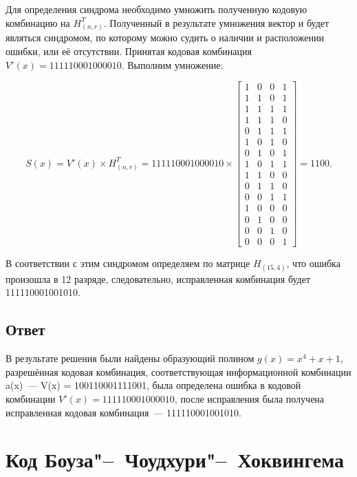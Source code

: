 Для определения синдрома необходимо умножить полученную кодовую
комбинацию на $H^T_{(n, r)}$. Полученный в результате умножения вектор
и будет являться синдромом, по которому можно судить о наличии и
расположении ошибки, или её отсутствии. Принятая кодовая комбинация
$V'(x) = 111110001000010$. Выполним умножение:

\begin{equation*}
  S(x) = V'(x) \times H^T_{(n, r)} = 111110001000010 \times
  \left[
    \begin{array}{cccc}
      1 & 0 & 0 & 1 \\
      1 & 1 & 0 & 1 \\
      1 & 1 & 1 & 1 \\
      1 & 1 & 1 & 0 \\
      0 & 1 & 1 & 1 \\
      1 & 0 & 1 & 0 \\
      0 & 1 & 0 & 1 \\
      1 & 0 & 1 & 1 \\
      1 & 1 & 0 & 0 \\
      0 & 1 & 1 & 0 \\
      0 & 0 & 1 & 1 \\
      1 & 0 & 0 & 0 \\
      0 & 1 & 0 & 0 \\
      0 & 0 & 1 & 0 \\
      0 & 0 & 0 & 1 
    \end{array}
  \right] = 1100.
\end{equation*}

В соответствии с этим синдромом определяем по матрице $H_{(15,4)}$,
что ошибка произошла в 12 разряде, следовательно, исправленная
комбинация будет 111110001001010.

\subsection{Ответ}

В результате решения были найдены образующий полином $g(x) = x^4 + x
+1$, разрешённая кодовая комбинация, соответствующая информационной
комбинации a(x)~--- V(x) = 100110001111001, была определена ошибка в
кодовой комбинации $V'(x) = 111110001000010$, после исправления была
получена исправленная кодовая комбинация~--- 111110001001010.
\newpage

\section{Код Боуза"--~Чоудхури"--~Хоквингема}
\label{sec:BCH}

